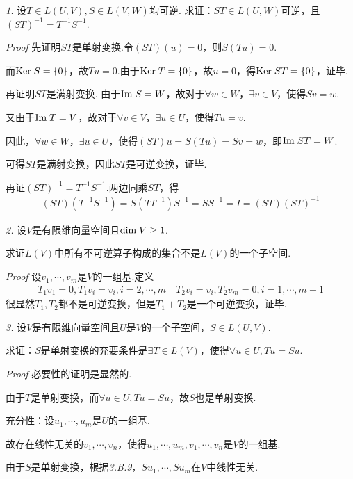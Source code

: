 \textit{1.}
设\(T \in L(U,V),S \in L(V,W)\)均可逆.
求证：\(ST \in L(U,W)\)可逆，且\((ST)^{-1}=T^{-1}S^{-1}\).

\textit{Proof}
先证明\(ST\)是单射变换.令\((ST)(u)=0\)，则\(S(Tu)=0\).

而\(\mathrm{Ker \;} S=\{0\}\)，故\(Tu=0\).由于\(\mathrm{Ker \;} T=\{0\}\)，故\(u=0\)，得\(\mathrm{Ker \;} ST=\{0\}\)，证毕.

再证明\(ST\)是满射变换.
由于\(\mathrm{Im \;} S=W\)，故对于\(\forall w \in W\)，\(\exists v \in V\)，使得\(Sv=w\).

又由于\(\mathrm{Im \;} T=V\)，故对于\(\forall v \in V\)，\(\exists u \in U\)，使得\(Tu=v\).

因此，\(\forall w \in W\)，\(\exists u \in U\)，使得\((ST)u=S(Tu)=Sv=w\)，即\(\mathrm{Im \;} ST=W\).

可得\(ST\)是满射变换，因此\(ST\)是可逆变换，证毕.

再证\((ST)^{-1}=T^{-1}S^{-1}\).两边同乘\(ST\)，得
    \begin{align*}
        (ST)(T^{-1}S^{-1})=S(TT^{-1})S^{-1}=SS^{-1}=I=(ST)(ST)^{-1}
    \end{align*}

\hspace*{\fill}

\textit{2.}
设\(V\)是有限维向量空间且\(\mathrm{dim \;} V \geq 1\).

求证\(L(V)\)中所有不可逆算子构成的集合不是\(L(V)\)的一个子空间.

\textit{Proof}
设\(v_1,\cdots,v_m\)是\(V\)的一组基.定义
    \begin{align*}
        T_1v_1=0,T_1v_i=v_i,i=2,\cdots,m \quad
        T_2v_i=v_i,T_2v_m=0,i=1,\cdots,m-1
    \end{align*}
很显然\(T_1,T_2\)都不是可逆变换，但是\(T_1+T_2\)是一个可逆变换，证毕.

\hspace*{\fill}

\textit{3.}
设\(V\)是有限维向量空间且\(U\)是\(V\)的一个子空间，\(S \in L(U,V)\).

求证：\(S\)是单射变换的充要条件是\(\exists T \in L(V)\)，使得\(\forall u \in U,Tu=Su\).

\textit{Proof}
必要性的证明是显然的.

由于\(T\)是单射变换，而\(\forall u \in U,Tu=Su\)，故\(S\)也是单射变换.

充分性：设\(u_1,\cdots,u_m\)是\(U\)的一组基.

故存在线性无关的\(v_1,\cdots,v_n\)，使得\(u_1,\cdots,u_m,v_1,\cdots,v_n\)是\(V\)的一组基.

由于\(S\)是单射变换，根据\textit{3.B.9}，\(Su_1,\cdots,Su_m\)在\(V\)中线性无关.


